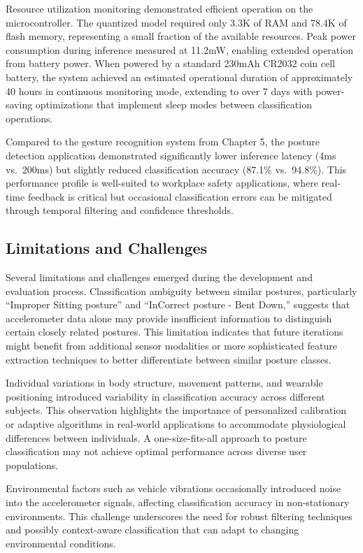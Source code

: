 \documentclass[
  9pt,
  letterpaper,
  abstract,
  titlepage]{scrbook}
\begin{document}
Resource utilization monitoring demonstrated efficient operation on the
microcontroller. The quantized model required only 3.3K of RAM and 78.4K
of flash memory, representing a small fraction of the available
resources. Peak power consumption during inference measured at 11.2mW,
enabling extended operation from battery power. When powered by a
standard 230mAh CR2032 coin cell battery, the system achieved an
estimated operational duration of approximately 40 hours in continuous
monitoring mode, extending to over 7 days with power-saving
optimizations that implement sleep modes between classification
operations.

Compared to the gesture recognition system from Chapter 5, the posture
detection application demonstrated significantly lower inference latency
(4ms vs.~200ms) but slightly reduced classification accuracy (87.1\%
vs.~94.8\%). This performance profile is well-suited to workplace safety
applications, where real-time feedback is critical but occasional
classification errors can be mitigated through temporal filtering and
confidence thresholds.

\subsection{Limitations and
Challenges}\label{limitations-and-challenges}

Several limitations and challenges emerged during the development and
evaluation process. Classification ambiguity between similar postures,
particularly ``Improper Sitting posture'' and ``InCorrect posture - Bent
Down,'' suggests that accelerometer data alone may provide insufficient
information to distinguish certain closely related postures. This
limitation indicates that future iterations might benefit from
additional sensor modalities or more sophisticated feature extraction
techniques to better differentiate between similar posture classes.

Individual variations in body structure, movement patterns, and wearable
positioning introduced variability in classification accuracy across
different subjects. This observation highlights the importance of
personalized calibration or adaptive algorithms in real-world
applications to accommodate physiological differences between
individuals. A one-size-fits-all approach to posture classification may
not achieve optimal performance across diverse user populations.

Environmental factors such as vehicle vibrations occasionally introduced
noise into the accelerometer signals, affecting classification accuracy
in non-stationary environments. This challenge underscores the need for
robust filtering techniques and possibly context-aware classification
that can adapt to changing environmental conditions.
\end{document}
